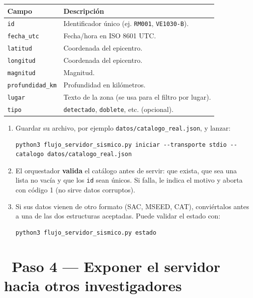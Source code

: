 \documentclass[11pt,a4paper]{article}
\newcommand{\iconotexto}[2]{\textcolor{cyanNeon}{\faIcon{#1}}~#2}
\begin{document}
\begin{tcolorbox}[tarjetaDato, title={\faIcon{cubes}~Formato del cat\'alogo}]
\begin{tabularx}{\linewidth}{@{}p{4.4cm}X@{}}
\toprule
\textbf{Campo} & \textbf{Descripci\'on} \\
\midrule
\texttt{id}          & Identificador \'unico (ej. \texttt{RM001}, \texttt{VE1030-B}). \\
\texttt{fecha\_utc}  & Fecha/hora en ISO 8601 UTC. \\
\texttt{latitud}     & Coordenada del epicentro. \\
\texttt{longitud}    & Coordenada del epicentro. \\
\texttt{magnitud}    & Magnitud. \\
\texttt{profundidad\_km} & Profundidad en kil\'ometros. \\
\texttt{lugar}       & Texto de la zona (se usa para el filtro por lugar). \\
\texttt{tipo}        & \texttt{detectado}, \texttt{doblete}, etc. (opcional). \\
\bottomrule
\end{tabularx}
\end{tcolorbox}

\begin{enumerate}[leftmargin=1.8em, itemsep=4pt]
  \item Guardar su archivo, por ejemplo \texttt{datos/catalogo\_real.json}, y lanzar:
\begin{lstlisting}
python3 flujo_servidor_sismico.py iniciar --transporte stdio --catalogo datos/catalogo_real.json
\end{lstlisting}
  \item El orquestador \textbf{valida} el cat\'alogo antes de servir: que exista, que sea una
        lista no vac\'ia y que los \texttt{id} sean \'unicos. Si falla, le indica el motivo y
        aborta con c\'odigo 1 (no sirve datos corruptos).
  \item Si sus datos vienen de otro formato (SAC, MSEED, CAT), convi\'ertalos antes a una de las
        dos estructuras aceptadas. Puede validar el estado con:
\begin{lstlisting}
python3 flujo_servidor_sismico.py estado
\end{lstlisting}
\end{enumerate}

\section{\iconotexto{network-wired}{Paso 4 --- Exponer el servidor hacia otros investigadores}}
\end{document}
